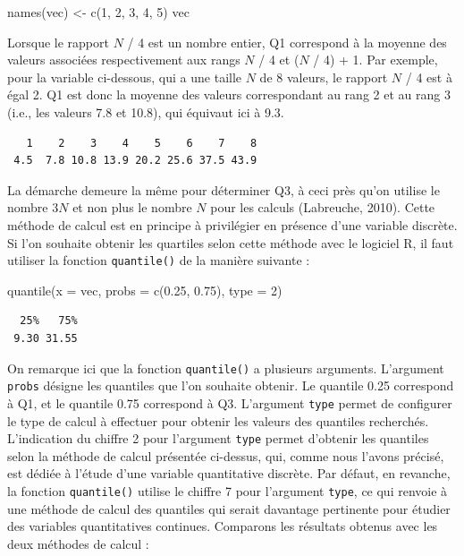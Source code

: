 \documentclass[
  letterpaper,
]{book}
\newenvironment{Shaded}{\begin{snugshade}}{\end{snugshade}}
\newcommand{\AttributeTok}[1]{\textcolor[rgb]{0.40,0.45,0.13}{#1}}
\newcommand{\DecValTok}[1]{\textcolor[rgb]{0.68,0.00,0.00}{#1}}
\newcommand{\FloatTok}[1]{\textcolor[rgb]{0.68,0.00,0.00}{#1}}
\newcommand{\FunctionTok}[1]{\textcolor[rgb]{0.28,0.35,0.67}{#1}}
\newcommand{\NormalTok}[1]{\textcolor[rgb]{0.00,0.23,0.31}{#1}}
\newcommand{\OtherTok}[1]{\textcolor[rgb]{0.00,0.23,0.31}{#1}}
\begin{document}
\begin{Shaded}
\begin{Highlighting}[]
\FunctionTok{names}\NormalTok{(vec) }\OtherTok{\textless{}{-}} \FunctionTok{c}\NormalTok{(}\DecValTok{1}\NormalTok{, }\DecValTok{2}\NormalTok{, }\DecValTok{3}\NormalTok{, }\DecValTok{4}\NormalTok{, }\DecValTok{5}\NormalTok{)}
\NormalTok{vec}
\end{Highlighting}
\end{Shaded}

Lorsque le rapport \(N\) / 4 est un nombre entier, Q1 correspond à la
moyenne des valeurs associées respectivement aux rangs \(N\) / 4 et
(\(N\) / 4) + 1. Par exemple, pour la variable ci-dessous, qui a une
taille \(N\) de 8 valeurs, le rapport \(N\) / 4 est à égal 2. Q1 est
donc la moyenne des valeurs correspondant au rang 2 et au rang 3 (i.e.,
les valeurs 7.8 et 10.8), qui équivaut ici à 9.3.

\begin{verbatim}
   1    2    3    4    5    6    7    8 
 4.5  7.8 10.8 13.9 20.2 25.6 37.5 43.9 
\end{verbatim}

La démarche demeure la même pour déterminer Q3, à ceci près qu'on
utilise le nombre 3\(N\) et non plus le nombre \(N\) pour les calculs
(Labreuche, 2010). Cette méthode de calcul est en principe à privilégier
en présence d'une variable discrète. Si l'on souhaite obtenir les
quartiles selon cette méthode avec le logiciel R, il faut utiliser la
fonction \texttt{quantile()} de la manière suivante :

\begin{Shaded}
\begin{Highlighting}[]
\FunctionTok{quantile}\NormalTok{(}\AttributeTok{x =}\NormalTok{ vec, }\AttributeTok{probs =} \FunctionTok{c}\NormalTok{(}\FloatTok{0.25}\NormalTok{, }\FloatTok{0.75}\NormalTok{), }\AttributeTok{type =} \DecValTok{2}\NormalTok{)}
\end{Highlighting}
\end{Shaded}

\begin{verbatim}
  25%   75% 
 9.30 31.55 
\end{verbatim}

On remarque ici que la fonction \texttt{quantile()} a plusieurs
arguments. L'argument \texttt{probs} désigne les quantiles que l'on
souhaite obtenir. Le quantile 0.25 correspond à Q1, et le quantile 0.75
correspond à Q3. L'argument \texttt{type} permet de configurer le type
de calcul à effectuer pour obtenir les valeurs des quantiles recherchés.
L'indication du chiffre 2 pour l'argument \texttt{type} permet d'obtenir
les quantiles selon la méthode de calcul présentée ci-dessus, qui, comme
nous l'avons précisé, est dédiée à l'étude d'une variable quantitative
discrète. Par défaut, en revanche, la fonction \texttt{quantile()}
utilise le chiffre 7 pour l'argument \texttt{type}, ce qui renvoie à une
méthode de calcul des quantiles qui serait davantage pertinente pour
étudier des variables quantitatives continues. Comparons les résultats
obtenus avec les deux méthodes de calcul :
\end{document}
